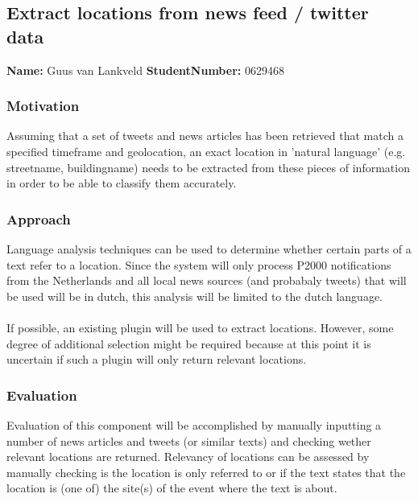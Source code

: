 \subsection*{Extract locations from  news feed / twitter data}
\textbf{Name:}  Guus van Lankveld \indent \textbf{StudentNumber:} 0629468

\subsubsection*{Motivation}
Assuming that a set of tweets and news articles has been retrieved that match a specified timeframe and geolocation, an exact location in 'natural language' (e.g. streetname, buildingname) needs to be extracted from these pieces of information in order to be able to classify them accurately. 

\subsubsection*{Approach}
Language analysis techniques can be used to determine whether certain parts of a text refer to a location. Since the system will only process P2000 notifications from the Netherlands and all local news sources (and probabaly tweets) that will be used will be in dutch, this analysis will be limited to the dutch language.\\\\
If possible, an existing plugin will be used to extract locations. However, some degree of additional selection might be required because at this point it is uncertain if such a plugin will only return relevant locations.

\subsubsection*{Evaluation }
Evaluation of this component will be accomplished by manually inputting a number of news articles and tweets (or similar texts) and checking wether relevant locations are returned. Relevancy of locations can be assessed by manually checking is the location is only referred to or if the text states that the location is (one of) the site(s) of the event where the text is about.